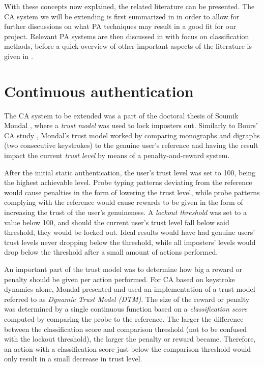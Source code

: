 With these concepts now explained, the related literature can be presented.
The CA system we will be extending is first summarized in  in order to allow for further discussions on what PA techniques may result in a good fit for our project.
Relevant PA systems are then discussed in  with focus on classification methods, before a quick overview of other important aspects of the literature is given in .

\section{Continuous authentication}
\label{sec:related-CA}
The CA system to be extended was a part of the doctoral thesis of Soumik Mondal \cite{mondal}, where a \textit{trust model} was used to lock imposters out.
Similarly to Bours' CA study \cite{BOURS201236}, Mondal's trust model worked by comparing monographs and digraphs (two consecutive keystrokes) to the genuine user's reference and having the result impact the current \textit{trust level} by means of a penalty-and-reward system.

After the initial static authentication, the user's trust level was set to 100, being the highest achievable level.
Probe typing patterns deviating from the reference would cause penalties in the form of lowering the trust level, while probe patterns complying with the reference would cause rewards to be given in the form of increasing the trust of the user's genuineness.
A \textit{lockout threshold} was set to a value below 100, and should the current user's trust level fall below said threshold, they would be locked out.
Ideal results would have had genuine users' trust levels never dropping below the threshold, while all imposters' levels would drop below the threshold after a small amount of actions performed.

An important part of the trust model was to determine how big a reward or penalty should be given per action performed.
For CA based on keystroke dynamics alone, Mondal \cite{mondal} presented and used an implementation of a trust model referred to as \textit{Dynamic Trust Model (DTM)}.
The size of the reward or penalty was determined by a single continuous function based on a \textit{classification score} computed by comparing the probe to the reference.
The larger the difference between the classification score and comparison threshold (not to be confused with the lockout threshold), the larger the penalty or reward became.
Therefore, an action with a classification score just below the comparison threshold would only result in a small decrease in trust level.

